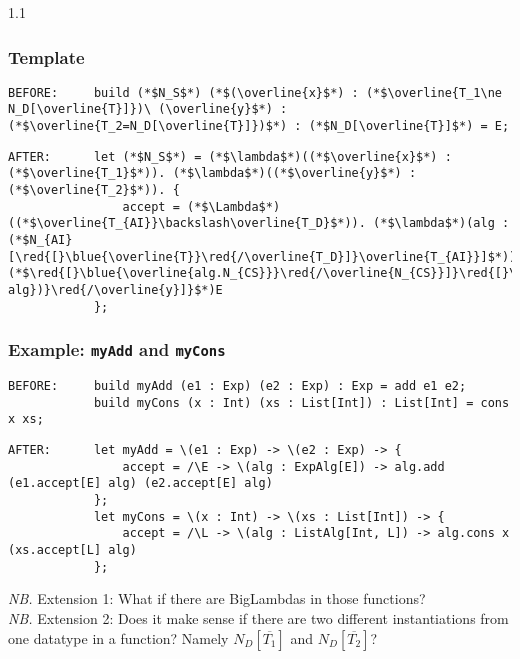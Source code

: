 \documentclass{article}
\newcommand{\red}[1]{\textcolor{red}{#1}}
\newcommand{\blue}[1]{\textcolor{blue}{#1}}
\newcommand{\nb}{\textit{NB. }}
\begin{document}
\begin{spacing}{1.1}
\subsubsection{Template}

\begin{lstlisting}[numbers=none]
BEFORE:     build (*$N_S$*) (*$(\overline{x}$*) : (*$\overline{T_1\ne N_D[\overline{T}]})\ (\overline{y}$*) : (*$\overline{T_2=N_D[\overline{T}]})$*) : (*$N_D[\overline{T}]$*) = E;
\end{lstlisting}
\begin{lstlisting}[numbers=none]
AFTER:      let (*$N_S$*) = (*$\lambda$*)((*$\overline{x}$*) : (*$\overline{T_1}$*)). (*$\lambda$*)((*$\overline{y}$*) : (*$\overline{T_2}$*)). {
                accept = (*$\Lambda$*)((*$\overline{T_{AI}}\backslash\overline{T_D}$*)). (*$\lambda$*)(alg : (*$N_{AI}[\red{[}\blue{\overline{T}}\red{/\overline{T_D}]}\overline{T_{AI}}]$*)). (*$\red{[}\blue{\overline{alg.N_{CS}}}\red{/\overline{N_{CS}}]}\red{[}\blue{(\overline{y.accept[\overline{T_{AI}}\backslash\overline{T_D}]\ alg})}\red{/\overline{y}]}$*)E
            };
\end{lstlisting}

\subsubsection{Example: \lstinline{myAdd} and \lstinline{myCons}}

\begin{lstlisting}[numbers=none]
BEFORE:     build myAdd (e1 : Exp) (e2 : Exp) : Exp = add e1 e2;
            build myCons (x : Int) (xs : List[Int]) : List[Int] = cons x xs;
\end{lstlisting}
\begin{lstlisting}[numbers=none]
AFTER:      let myAdd = \(e1 : Exp) -> \(e2 : Exp) -> {
                accept = /\E -> \(alg : ExpAlg[E]) -> alg.add (e1.accept[E] alg) (e2.accept[E] alg)
            };
            let myCons = \(x : Int) -> \(xs : List[Int]) -> {
                accept = /\L -> \(alg : ListAlg[Int, L]) -> alg.cons x (xs.accept[L] alg)
            };
\end{lstlisting}

\nb Extension 1: What if there are BigLambdas in those functions?\\

\nb Extension 2: Does it make sense if there are two different instantiations from one datatype in a function? Namely $N_D[\overline{T_1}]$ and $N_D[\overline{T_2}]$?\\


\end{spacing}
\end{document}
